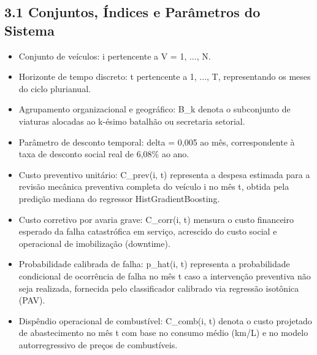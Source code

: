 \documentclass[10pt,a4paper,journal]{article}
\begin{document}
\subsection{3.1 Conjuntos, Índices e Parâmetros do Sistema}
\begin{itemize}
\item Conjunto de veículos: i pertencente a V = {1, ..., N}.
\end{itemize}
\begin{itemize}
\item Horizonte de tempo discreto: t pertencente a {1, ..., T}, representando os meses do ciclo plurianual.
\end{itemize}
\begin{itemize}
\item Agrupamento organizacional e geográfico: B\_k denota o subconjunto de viaturas alocadas ao k-ésimo batalhão ou secretaria setorial.
\end{itemize}
\begin{itemize}
\item Parâmetro de desconto temporal: delta = 0,005 ao mês, correspondente à taxa de desconto social real de 6,08\% ao ano.
\end{itemize}
\begin{itemize}
\item Custo preventivo unitário: C\_prev(i, t) representa a despesa estimada para a revisão mecânica preventiva completa do veículo i no mês t, obtida pela predição mediana do regressor HistGradientBoosting.
\end{itemize}
\begin{itemize}
\item Custo corretivo por avaria grave: C\_corr(i, t) mensura o custo financeiro esperado da falha catastrófica em serviço, acrescido do custo social e operacional de imobilização (downtime).
\end{itemize}
\begin{itemize}
\item Probabilidade calibrada de falha: p\_hat(i, t) representa a probabilidade condicional de ocorrência de falha no mês t caso a intervenção preventiva não seja realizada, fornecida pelo classificador calibrado via regressão isotônica (PAV).
\end{itemize}
\begin{itemize}
\item Dispêndio operacional de combustível: C\_comb(i, t) denota o custo projetado de abastecimento no mês t com base no consumo médio (km/L) e no modelo autorregressivo de preços de combustíveis.
\end{itemize}
\end{document}
